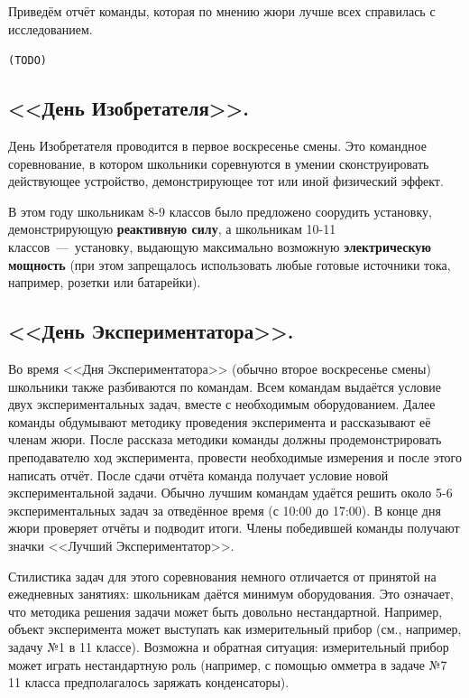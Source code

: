 \documentclass[12pt,a4paper,oneside,draft]{scrartcl}
\newlength{\h}
\newlength{\x}
\newcommand{\com}[1]{{\Large{\texttt{{\color{red}(#1)}}}}}
\begin{document}
Приведём отчёт команды, которая по мнению жюри лучше всех
справилась с исследованием. 



\com{TODO}

\subsection{<<День Изобретателя>>.}
\label{sec:day_inventor}

День Изобретателя проводится в первое воскресенье смены. Это командное
соревнование, в котором школьники соревнуются в умении сконструировать
действующее устройство, демонстрирующее тот или иной физический
эффект. 

В этом году школьникам 8-9 классов было предложено соорудить
установку, демонстрирующую \textbf{реактивную силу}, а школьникам
10-11 классов~---~установку, выдающую максимально возможную
\textbf{электрическую мощность} (при этом запрещалось использовать
любые готовые источники тока, например, розетки или батарейки). 

\subsection{<<День Экспериментатора>>.}
\label{sec:day_exp}

Во время <<Дня Экспериментатора>> (обычно второе воскресенье смены)
школьники также разбиваются по командам. Всем командам выдаётся
условие двух экспериментальных задач, вместе с необходимым
оборудованием. Далее команды обдумывают методику проведения
эксперимента и рассказывают её членам жюри. После рассказа методики
команды должны продемонстрировать преподавателю ход эксперимента,
провести необходимые измерения и после этого написать отчёт. После
сдачи отчёта команда получает условие новой экспериментальной
задачи. Обычно лучшим командам удаётся решить около 5-6
экспериментальных задач за отведённое время (с 10:00 до 17:00). В
конце дня жюри проверяет отчёты и подводит итоги. Члены победившей
команды получают значки <<Лучший Экспериментатор>>.

Стилистика задач для этого соревнования немного отличается от принятой
на ежедневных занятиях: школьникам даётся минимум оборудования. Это
означает, что методика решения задачи может быть довольно
нестандартной. Например, объект эксперимента может выступать как
измерительный прибор (см., например, задачу №1 в 11 классе). Возможна
и обратная ситуация: измерительный прибор может играть нестандартную
роль (например, с помощью омметра в задаче №7 11 класса
предполагалось заряжать конденсаторы). 
\end{document}
